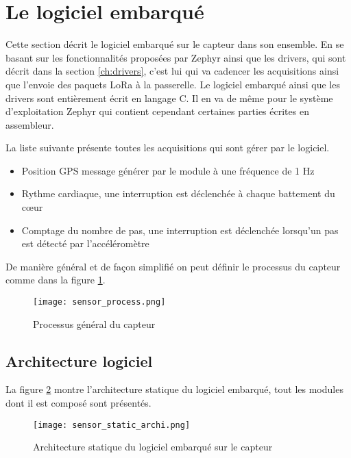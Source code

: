 \section{Le logiciel embarqué}

Cette section décrit le logiciel embarqué sur le capteur dans son ensemble. En se basant sur les fonctionnalités proposées par Zephyr ainsi que les drivers, qui sont décrit dans la section \ref{ch:drivers}, c'est lui qui va cadencer les acquisitions ainsi que l'envoie des paquets LoRa à la passerelle. Le logiciel embarqué ainsi que les drivers sont entièrement écrit en langage C. Il en va de même pour le système d'exploitation Zephyr qui contient cependant certaines parties écrites en assembleur.

La liste suivante présente toutes les acquisitions qui sont gérer par le logiciel.

\begin{itemize}
\item Position GPS message générer par le module à une fréquence de 1 Hz
\item Rythme cardiaque, une interruption est déclenchée à chaque battement du cœur
\item Comptage du nombre de pas, une interruption est déclenchée lorsqu'un pas est détecté par l'accéléromètre
\end{itemize}

De manière général et de façon simplifié on peut définir le processus du capteur comme dans la figure \ref{fig:sensor_process}.

\begin{figure}[htb]
\centering 
\texttt{[image: sensor\_process.png]} 
\caption{Processus général du capteur}
\label{fig:sensor_process}
\end{figure}

\subsection{Architecture logiciel}

La figure \ref{fig:sensor_static_archi} montre l'architecture statique du logiciel embarqué, tout les modules dont il est composé sont présentés.

\begin{figure}[htb]
\centering 
\texttt{[image: sensor\_static\_archi.png]} 
\caption{Architecture statique du logiciel embarqué sur le capteur}
\label{fig:sensor_static_archi}
\end{figure}

